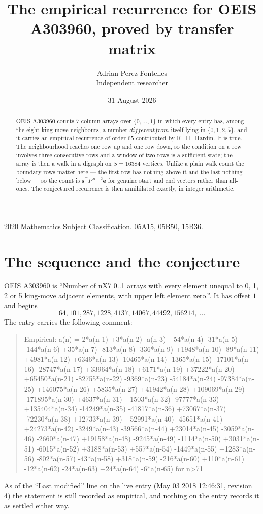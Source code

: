 \documentclass[11pt,a4paper]{article}
\title{The empirical recurrence for OEIS A303960, proved by transfer matrix}
\author{Adrian Perez Fontelles\\ \small Independent researcher}
\date{31 August 2026}
\theoremstyle{plain}
\theoremstyle{definition}
\begin{document}
\maketitle

\begin{abstract}
OEIS A303960 counts $7$-column arrays over $\{0,\dots,1\}$ in which every entry has,
among the eight king-move neighbours, a number $different from$ itself lying in $\{0,1,2,5\}$, and it carries an empirical
recurrence of order $65$ contributed by R.~H.~Hardin. It is true. The neighbourhood
reaches one row up and one row down, so the condition on a row involves three consecutive
rows and a window of two rows is a sufficient state; the array is then a walk in a digraph
on $S=16384$ vertices. Unlike a plain walk count the boundary rows matter here --- the first
row has nothing above it and the last nothing below --- so the count is
$\mathbf{s}^{\!\top}P^{\,n-2}\mathbf{e}$ for genuine start and end vectors rather than
all-ones. The conjectured recurrence is then annihilated exactly, in integer arithmetic.
\end{abstract}

\noindent\small 2020 Mathematics Subject Classification. 05A15, 05B50, 15B36.\normalsize

\section{The sequence and the conjecture}

OEIS A303960 is ``Number of nX7 0..1 arrays with every element unequal to 0, 1, 2 or 5 king-move adjacent elements, with upper left element zero.''. It has offset
$1$ and begins
\[
64, 101, 287, 1228, 4137, 14067, 44492, 156214,\ \dots
\]
The entry carries the following comment:
\begin{quote}\small
Empirical: a(n) = 2*a(n-1) +3*a(n-2) -a(n-3) +54*a(n-4) -31*a(n-5) -144*a(n-6) +35*a(n-7) -813*a(n-8) -336*a(n-9) +1948*a(n-10) -89*a(n-11) +4981*a(n-12) +6346*a(n-13) -10465*a(n-14) -1365*a(n-15) -17101*a(n-16) -28747*a(n-17) +33964*a(n-18) +6171*a(n-19) +37222*a(n-20) +65450*a(n-21) -82755*a(n-22) -9369*a(n-23) -54184*a(n-24) -97384*a(n-25) +146075*a(n-26) +5835*a(n-27) +41942*a(n-28) +109069*a(n-29) -171895*a(n-30) +4637*a(n-31) +1503*a(n-32) -97777*a(n-33) +135404*a(n-34) -14249*a(n-35) -41817*a(n-36) +73067*a(n-37) -72230*a(n-38) +12733*a(n-39) +52991*a(n-40) -45651*a(n-41) +24273*a(n-42) -3249*a(n-43) -39566*a(n-44) +23014*a(n-45) -3059*a(n-46) -2660*a(n-47) +19158*a(n-48) -9245*a(n-49) -1114*a(n-50) +3031*a(n-51) -6015*a(n-52) +3188*a(n-53) +557*a(n-54) -1449*a(n-55) +1283*a(n-56) -802*a(n-57) -43*a(n-58) +318*a(n-59) -216*a(n-60) +110*a(n-61) -12*a(n-62) -24*a(n-63) +24*a(n-64) -6*a(n-65) for n>71
\end{quote}
As of the ``Last modified'' line on the live entry (May 03 2018 12:46:31, revision
4) the statement is still recorded as empirical, and nothing on the entry
records it as settled either way.
\end{document}
